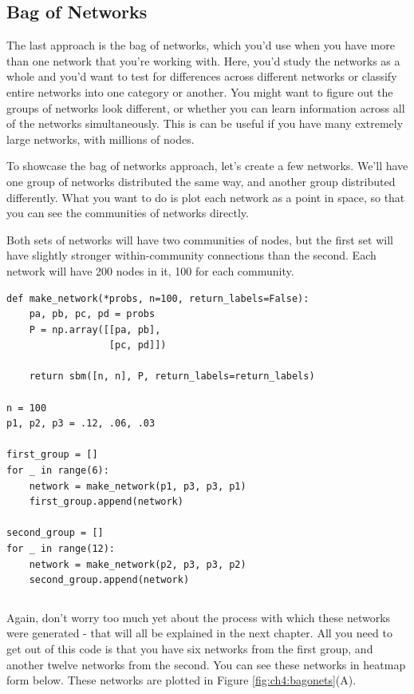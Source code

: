 \subsection{Bag of Networks}
\label{sec:ch4:net-rep:bagofnets}

The last approach is the bag of networks, which you'd use when you have more than one network that you're working with. Here, you'd study the networks as a whole and you'd want to test for differences across different networks or classify entire networks into one category or another. You might want to figure out the groups of networks look different, or whether you can learn information across all of the networks simultaneously. This is can be useful if you have many extremely large networks, with millions of nodes.

To showcase the bag of networks approach, let's create a few networks. We'll have one group of networks distributed the same way, and another group distributed differently. What you want to do is plot each network as a point in space, so that you can see the communities of networks directly.

Both sets of networks will have two communities of nodes, but the first set will have slightly stronger within-community connections than the second. Each network will have 200 nodes in it, 100 for each community.

\begin{lstlisting}[style=python]
def make_network(*probs, n=100, return_labels=False):
    pa, pb, pc, pd = probs
    P = np.array([[pa, pb], 
                  [pc, pd]])
    
    return sbm([n, n], P, return_labels=return_labels)

n = 100
p1, p2, p3 = .12, .06, .03

first_group = []
for _ in range(6):
    network = make_network(p1, p3, p3, p1)
    first_group.append(network)
    
second_group = []
for _ in range(12):
    network = make_network(p2, p3, p3, p2)
    second_group.append(network)
\end{lstlisting}

\begin{lstlisting}[style=python]
\end{lstlisting}
Again, don't worry too much yet about the process with which these networks were generated - that will all be explained in the next chapter. All you need to get out of this code is that you have six networks from the first group, and another twelve networks from the second. You can see these networks in heatmap form below. These networks are plotted in Figure \ref{fig:ch4:bagonets}(A). 

